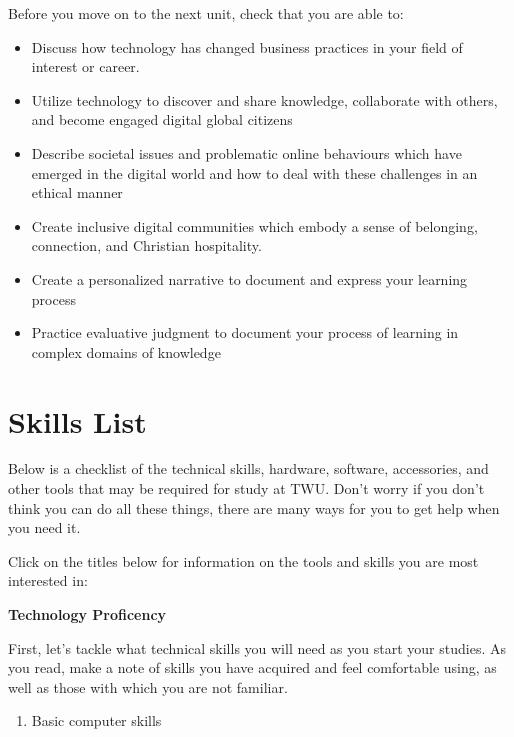 \documentclass[
]{book}
\providecommand{\tightlist}{%
  \setlength{\itemsep}{0pt}\setlength{\parskip}{0pt}}
\theoremstyle{definition}
\theoremstyle{definition}
\theoremstyle{definition}
\theoremstyle{definition}
\theoremstyle{remark}
\begin{document}
\begin{progress}
Before you move on to the next unit, check that you are able to:

\begin{itemize}
\tightlist
\item
  Discuss how technology has changed business practices in your field of interest or career.\\
\item
  Utilize technology to discover and share knowledge, collaborate with others, and become engaged digital global citizens\\
\item
  Describe societal issues and problematic online behaviours which have emerged in the digital world and how to deal with these challenges in an ethical manner\\
\item
  Create inclusive digital communities which embody a sense of belonging, connection, and Christian hospitality.
\item
  Create a personalized narrative to document and express your learning process
\item
  Practice evaluative judgment to document your process of learning in complex domains of knowledge
\end{itemize}
\end{progress}

\hypertarget{skills-list}{%
\chapter*{Skills List}\label{skills-list}}

Below is a checklist of the technical skills, hardware, software, accessories, and other tools that may be required for study at TWU. Don't worry if you don't think you can do all these things, there are many ways for you to get help when you need it.

Click on the titles below for information on the tools and skills you are most interested in:

\textbf{Technology Proficency}

First, let's tackle what technical skills you will need as you start your studies. As you read, make a note of skills you have acquired and feel comfortable using, as well as those with which you are not familiar.

\begin{enumerate}
\def\labelenumi{\arabic{enumi}.}
\tightlist
\item
  Basic computer skills\\
\end{enumerate}
\end{document}
